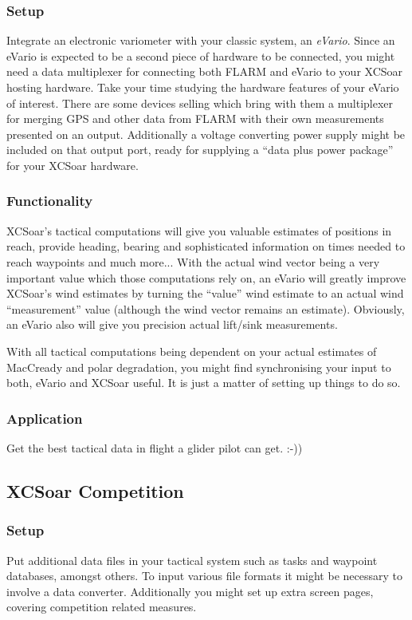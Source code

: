 \subsubsection*{Setup} Integrate an electronic variometer with your classic 
system, an \emph{eVario}. Since an eVario is expected to be a second piece of
hardware to be connected, you might need a data multiplexer for connecting both
FLARM and eVario to your XCSoar hosting hardware. Take your time studying the
hardware features of your eVario of interest. There are some devices selling
which bring with them a multiplexer for merging GPS and other data from FLARM with
their own measurements presented on an output. Additionally a voltage converting 
power supply might be included on that output port, ready for supplying a ``data
plus power package'' for your XCSoar hardware.

\subsubsection*{Functionality} XCSoar's tactical computations will give you 
valuable estimates of positions in reach, provide heading, bearing and 
sophisticated information on times needed to reach waypoints and much more... 
With the actual wind vector being a very important value which those computations rely
on, an eVario will greatly improve XCSoar's wind estimates by turning the ``value''
wind estimate to an actual wind ``measurement'' value (although the wind
vector remains an estimate). Obviously, an eVario also will give you precision 
actual lift/sink measurements.

With all tactical computations being dependent on your actual estimates of 
MacCready and polar degradation, you might find synchronising your input to both, 
eVario and XCSoar useful. It is just a matter of setting up things to do so.

\subsubsection*{Application} Get the best tactical data in flight a glider pilot
can get. :-))

\subsection*{XCSoar Competition}
\subsubsection*{Setup} Put additional data files in your tactical system such as
tasks and waypoint databases, amongst others. To input various file formats it
might be necessary to involve a data converter. Additionally you might set up 
extra screen pages, covering competition related measures.

